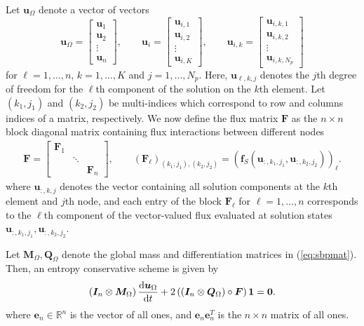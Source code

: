 \documentclass{article}
\newcommand{\td}[2]{\frac{{\rm d}#1}{{\rm d}{ {#2}}}}
\newcommand{\LRp}[1]{\left( #1 \right)}
\newcommand{\eq}[1]{\begin{align*}#1\end{align*}}
\newcommand{\eqlab}[1]{\begin{align}#1\end{align}}
\newcommand{\bmat}[1]{\begin{bmatrix}#1\end{bmatrix}}
\begin{document}
Let $\bm{u}_{\Omega}$ denote a vector of vectors 
\[
\bm{u}_{\Omega} = \bmat{\bm{u}_1\\
\bm{u}_2\\
\vdots\\
\bm{u}_n}, \qquad \bm{u}_i = \bmat{
\bm{u}_{i,1}\\
\bm{u}_{i,2}\\
\vdots\\
\bm{u}_{i,K}
}, \qquad
\bm{u}_{i,k} = \bmat{
\bm{u}_{i,k,1}\\
\bm{u}_{i,k,2}\\
\vdots\\
\bm{u}_{i,k,N_p}
}
\]
for $\ell = 1,\ldots, n$, $k = 1,\ldots, K$ and $j = 1,\ldots, N_p$.  Here, $\bm{u}_{\ell,k,j}$ denotes the $j$th degree of freedom for the $\ell$th component of the solution on the $k$th element.  
Let $(k_1, j_1)$ and $(k_2, j_2)$ be multi-indices which correspond to row and columns indices of a matrix, respectively.  
We now define the flux matrix $\bm{F}$ as the $n\times n$ block diagonal matrix containing flux interactions between different nodes
\eqlab{
\bm{F} = \bmat{
\bm{F}_1 &&\\
& \ddots &\\
&& \bm{F}_n
}, \qquad \LRp{\bm{F}_\ell}_{(k_1, j_1),(k_2,j_2)} = \LRp{\bm{f}_{S}\LRp{\bm{u}_{:, k_1,j_1},\bm{u}_{:, k_2,j_2}}}_{\ell}.
\label{eq:fluxsys}
}
where $\bm{u}_{:,k,j}$ denotes the vector containing all solution components at the $k$th element and $j$th node, and each entry of the block $\bm{F}_\ell$ for $\ell = 1,\ldots, n$ corresponds to the $\ell$th component of the vector-valued flux evaluated at solution states $\bm{u}_{:,k_1,j_1},\bm{u}_{:,k_2,j_2}$.  

Let $\bm{M}_{\Omega}, \bm{Q}_{\Omega}$ denote the global mass and differentiation matrices in (\ref{eq:sbpmat}).  Then, an entropy conservative scheme is given by
\[
\LRp{\bm{I}_n\otimes \bm{M}_{\Omega}}\td{\bm{u}_{\Omega}}{t} + 2\LRp{ \LRp{\bm{I}_n\otimes \bm{Q}_{\Omega} } \circ \bm{F}}\bm{1} = \bm{0}.
\]
where $\bm{e}_n\in \mathbb{R}^n$ is the vector of all ones, and $\bm{e}_n\bm{e}_n^T$ is the $n\times n$ matrix of all ones.  
\end{document}
